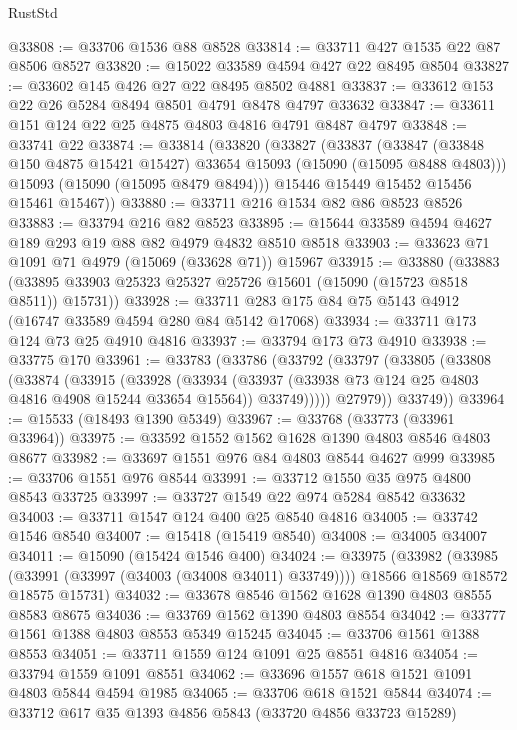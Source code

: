 \begin{lexlean}{RustStd}
\begin{coremodule}
@33808 := @33706 @1536 @88 @8528
@33814 := @33711 @427 @1535 @22 @87 @8506 @8527
@33820 := @15022 @33589 @4594 @427 @22 @8495 @8504
@33827 := @33602 @145 @426 @27 @22 @8495 @8502 @4881
@33837 := @33612 @153 @22 @26 @5284 @8494 @8501 @4791 @8478 @4797 @33632
@33847 := @33611 @151 @124 @22 @25 @4875 @4803 @4816 @4791 @8487 @4797
@33848 := @33741 @22
@33874 := @33814
    (@33820
      (@33827
        (@33837
          (@33847 (@33848 @150 @4875 @15421 @15427) @33654 @15093 (@15090 (@15095 @8488 @4803)))
          @15093
          (@15090 (@15095 @8479 @8494)))
        @15446
        @15449
        @15452
        @15456
        @15461
        @15467))
@33880 := @33711 @216 @1534 @82 @86 @8523 @8526
@33883 := @33794 @216 @82 @8523
@33895 := @15644 @33589 @4594 @4627 @189 @293 @19 @88 @82 @4979 @4832 @8510 @8518
@33903 := @33623 @71 @1091 @71 @4979 (@15069 (@33628 @71)) @15967
@33915 := @33880
    (@33883 (@33895 @33903 @25323 @25327 @25726 @15601 (@15090 (@15723 @8518 @8511)) @15731))
@33928 := @33711 @283 @175 @84 @75 @5143 @4912 (@16747 @33589 @4594 @280 @84 @5142 @17068)
@33934 := @33711 @173 @124 @73 @25 @4910 @4816
@33937 := @33794 @173 @73 @4910
@33938 := @33775 @170
@33961 := @33783
    (@33786
      (@33792
        (@33797
          (@33805
            (@33808
              (@33874
                (@33915
                  (@33928
                    (@33934
                      (@33937 (@33938 @73 @124 @25 @4803 @4816 @4908 @15244 @33654 @15564))
                      @33749)))))
            @27979))
        @33749))
@33964 := @15533 (@18493 @1390 @5349)
@33967 := @33768 (@33773 (@33961 @33964))
@33975 := @33592 @1552 @1562 @1628 @1390 @4803 @8546 @4803 @8677
@33982 := @33697 @1551 @976 @84 @4803 @8544 @4627 @999
@33985 := @33706 @1551 @976 @8544
@33991 := @33712 @1550 @35 @975 @4800 @8543 @33725
@33997 := @33727 @1549 @22 @974 @5284 @8542 @33632
@34003 := @33711 @1547 @124 @400 @25 @8540 @4816
@34005 := @33742 @1546 @8540
@34007 := @15418 (@15419 @8540)
@34008 := @34005 @34007
@34011 := @15090 (@15424 @1546 @400)
@34024 := @33975
    (@33982
      (@33985 (@33991 (@33997 (@34003 (@34008 @34011) @33749))))
      @18566
      @18569
      @18572
      @18575
      @15731)
@34032 := @33678 @8546 @1562 @1628 @1390 @4803 @8555 @8583 @8675
@34036 := @33769 @1562 @1390 @4803 @8554
@34042 := @33777 @1561 @1388 @4803 @8553 @5349 @15245
@34045 := @33706 @1561 @1388 @8553
@34051 := @33711 @1559 @124 @1091 @25 @8551 @4816
@34054 := @33794 @1559 @1091 @8551
@34062 := @33696 @1557 @618 @1521 @1091 @4803 @5844 @4594 @1985
@34065 := @33706 @618 @1521 @5844
@34074 := @33712 @617 @35 @1393 @4856 @5843 (@33720 @4856 @33723 @15289)

\end{coremodule}
\end{lexlean}
